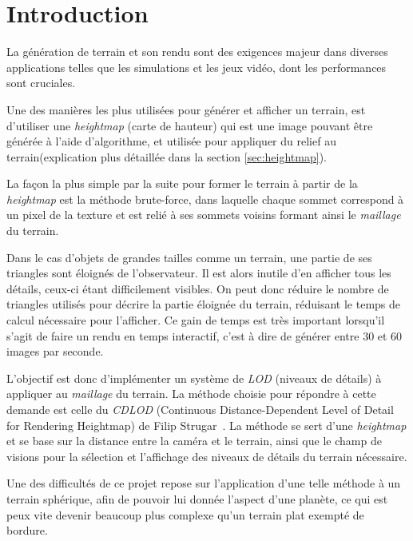   \chapter*{Introduction}
  \setcounter{chapter}{0}
  
  La génération de terrain et son rendu sont des exigences majeur dans diverses applications telles que les simulations et les jeux vidéo, dont les performances sont cruciales.
  
  Une des manières les plus utilisées pour générer et afficher un terrain, est d'utiliser une \emph{heightmap} (carte de hauteur) qui est une image pouvant être générée à l'aide d'algorithme, et utilisée pour appliquer du relief au terrain(explication plus détaillée dans la section \ref{sec:heightmap}).
  
  La façon la plus simple par la suite pour former le terrain à partir de la \emph{heightmap} est la méthode brute-force, dans laquelle chaque sommet correspond à un pixel de la texture et est relié à ses sommets voisins formant ainsi le \emph{maillage} du terrain.
  
  Dans le cas d'objets de grandes tailles comme un terrain, une partie de
  ses triangles sont éloignés de l'observateur. Il est alors inutile d'en
  afficher tous les détails, ceux-ci étant difficilement visibles. On peut
  donc réduire le nombre de triangles utilisés pour décrire la partie
  éloignée du terrain, réduisant le temps de calcul nécessaire pour
  l'afficher. Ce gain de temps est très important lorsqu'il s'agit de
  faire un rendu en temps interactif, c'est à dire de générer entre 30 et
  60 images par seconde.
  
  L'objectif est donc d'implémenter un système de \emph{LOD} (niveaux de détails) à appliquer au \emph{maillage} du terrain. La méthode choisie pour répondre à cette demande est celle du \emph{CDLOD} (Continuous Distance-Dependent Level of Detail for Rendering Heightmap) de Filip Strugar~\cite{CDLOD}. La méthode se sert d'une \emph{heightmap} et se base sur la distance entre la caméra et le terrain, ainsi que le champ de visions pour la sélection et l'affichage des niveaux de détails du terrain nécessaire.
  
  Une des difficultés de ce projet repose sur l'application d'une telle méthode à un terrain sphérique, afin de pouvoir lui donnée l'aspect d'une planète, ce qui est peux vite devenir beaucoup plus complexe qu'un terrain plat exempté de bordure.
  
